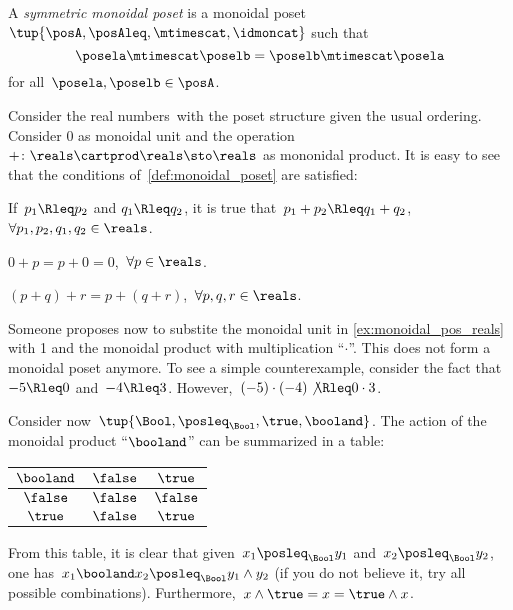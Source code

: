 \begin{ctdefinition}
  \label{def:sym_monoidal_poset}
A \emph{symmetric monoidal poset} is a monoidal poset~$\tup{\posA, \posAleq, \mtimescat, \idmoncat}$ such that
\begin{equation*}
\posela \mtimescat \poselb = \poselb \mtimescat \posela
\end{equation*}
for all~$\posela, \poselb \in \posA$.
\end{ctdefinition}

\begin{example}
  \label{ex:monoidal_pos_reals}
  Consider the real numbers~\reals with the poset structure given the usual ordering.
  Consider 0 as monoidal unit and the operation~$+\colon \reals\cartprod \reals\sto \reals$ as mononidal product.
  It is easy to see that the conditions of~\cref{def:monoidal_poset} are satisfied:
  \begin{compactenum}[(a)]
    \item If~$p_1\Rleq  p_2$ and $q_1\Rleq  q_2$, it is true that~$p_1+p_2\Rleq  q_1+q_2$,~$\forall p_1,p_2,q_1,q_2\in \reals$.
    \item $0+p=p+0=0$,~$\forall p\in \reals$.
    \item $(p+q)+r=p+(q+r)$,~$\forall p,q,r\in \reals$.
  \end{compactenum}
\end{example}

\begin{example}
  Someone proposes now to substite the monoidal unit in \cref{ex:monoidal_pos_reals} with 1 and the monoidal product with
  multiplication ``$\cdot$''. This does not form a monoidal poset anymore. To see a simple counterexample, consider the fact that~$-5\Rleq 0$ and~$-4\Rleq 3$. However,~$(-5)\cdot (-4) \not{\Rleq} 0 \cdot 3$.
\end{example}

\begin{example}
  Consider now~$\tup{\Bool,\posleq_{\Bool},\true,\booland}$. The action of the monoidal product ``$\booland$'' can be summarized in a table:
  \begin{center}
    \begin{tabular}{c|cc}
      $\booland$ & $\false$ & $\true$  \\
      \hline
      $\false$ & $\false$ & $\false$ \\
      $\true$  & $\false$ & $\true$
    \end{tabular}
  \end{center}
  From this table, it is clear that given~$x_1\posleq_{\Bool}y_1$ and~$x_2\posleq_{\Bool} y_2$, one has~$x_1\booland x_2\posleq_{\Bool} y_1\wedge y_2$ (if you do not believe it, try all possible combinations). Furthermore,~$x\wedge \true=x=\true \wedge x$.
\end{example}

